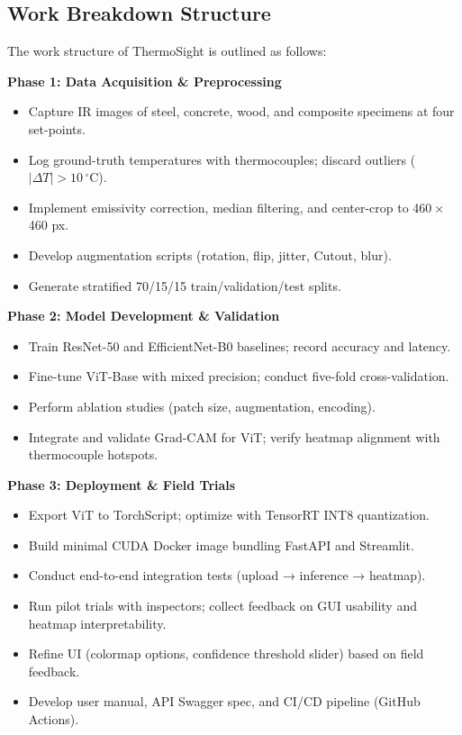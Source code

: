 \subsection{Work Breakdown Structure}
The work structure of ThermoSight is outlined as follows:

\textbf{Phase 1: Data Acquisition \& Preprocessing}
\begin{itemize}
    \item Capture IR images of steel, concrete, wood, and composite specimens at four set-points.
    \item Log ground-truth temperatures with thermocouples; discard outliers ($|\Delta T| > 10\,\mathrm{^{\circ}C}$).
    \item Implement emissivity correction, median filtering, and center-crop to 460 × 460 px.
    \item Develop augmentation scripts (rotation, flip, jitter, Cutout, blur).
    \item Generate stratified 70/15/15 train/validation/test splits.
\end{itemize}

\textbf{Phase 2: Model Development \& Validation}
\begin{itemize}
    \item Train ResNet-50 and EfficientNet-B0 baselines; record accuracy and latency.
    \item Fine-tune ViT-Base with mixed precision; conduct five-fold cross-validation.
    \item Perform ablation studies (patch size, augmentation, encoding).
    \item Integrate and validate Grad-CAM for ViT; verify heatmap alignment with thermocouple hotspots.
\end{itemize}

\textbf{Phase 3: Deployment \& Field Trials}
\begin{itemize}
    \item Export ViT to TorchScript; optimize with TensorRT INT8 quantization.
    \item Build minimal CUDA Docker image bundling FastAPI and Streamlit.
    \item Conduct end-to-end integration tests (upload → inference → heatmap).
    \item Run pilot trials with inspectors; collect feedback on GUI usability and heatmap interpretability.
    \item Refine UI (colormap options, confidence threshold slider) based on field feedback.
    \item Develop user manual, API Swagger spec, and CI/CD pipeline (GitHub Actions).
\end{itemize}

